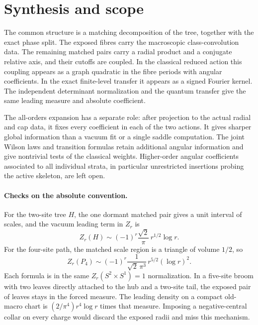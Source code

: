 \section{Synthesis and scope}\label{intro:conclusion}
The common structure is a matching decomposition of the tree, together with the exact phase split. The exposed fibres carry the macroscopic class-convolution data. The remaining matched pairs carry a radial product and a conjugate relative axis, and their cutoffs are coupled. In the classical reduced action this coupling appears as a graph quadratic in the fibre periods with angular coefficients. In the exact finite-level transfer it appears as a signed Fourier kernel. The independent determinant normalization and the quantum transfer give the same leading measure and absolute coefficient.

The all-orders expansion has a separate role: after projection to the actual radial and cap data, it fixes every coefficient in each of the two actions. It gives sharper global information than a vacuum fit or a single saddle computation. The joint Wilson laws and transition formulas retain additional angular information and give nontrivial tests of the classical weights. Higher-order angular coefficients associated to all individual strata, in particular unrestricted insertions probing the active skeleton, are left open.

\paragraph{Checks on the absolute convention.}
For the two-site tree \(H\), the one dormant matched pair gives a unit interval of scales, and the vacuum leading term in \(Z_r\) is
\[
 Z_r(H)\sim (-1)^r\frac{\sqrt2}{\pi}\,r^{1/2}\log r.
\]
For the four-site path, the matched scale region is a triangle of volume \(1/2\), so
\[
 Z_r(P_4)\sim (-1)^r\frac{1}{\sqrt2\,\pi^3}\,r^{5/2}(\log r)^2.
\]
Each formula is in the same \(Z_r(S^2\times S^1)=1\) normalization. In a five-site broom with two leaves directly attached to the hub and a two-site tail, the exposed pair of leaves stays in the forced measure. The leading density on a compact old-macro chart is \((2/\pi^4)r^4\log r\) times that measure. Imposing a negative-central collar on every charge would discard the exposed radii and miss this mechanism.
